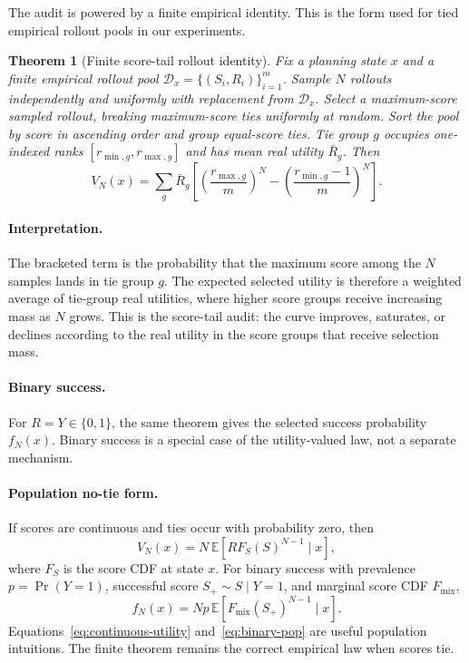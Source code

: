 \documentclass{article}
\newtheorem{theorem}{Theorem}
\begin{document}
The audit is powered by a finite empirical identity. This is the form used for tied empirical rollout pools in our experiments.

\begin{theorem}[Finite score-tail rollout identity]
\label{thm:finite}
Fix a planning state $x$ and a finite empirical rollout pool $\mathcal{D}_x=\{(S_i,R_i)\}_{i=1}^m$. Sample $N$ rollouts independently and uniformly with replacement from $\mathcal{D}_x$. Select a maximum-score sampled rollout, breaking maximum-score ties uniformly at random. Sort the pool by score in ascending order and group equal-score ties. Tie group $g$ occupies one-indexed ranks $[r_{\min,g},r_{\max,g}]$ and has mean real utility $\bar R_g$. Then
\[
V_N(x)=
\sum_g \bar R_g
\left[
\left(\frac{r_{\max,g}}{m}\right)^N
-
\left(\frac{r_{\min,g}-1}{m}\right)^N
\right].
\]
\end{theorem}

\paragraph{Interpretation.}
The bracketed term is the probability that the maximum score among the $N$ samples lands in tie group $g$. The expected selected utility is therefore a weighted average of tie-group real utilities, where higher score groups receive increasing mass as $N$ grows. This is the score-tail audit: the curve improves, saturates, or declines according to the real utility in the score groups that receive selection mass.

\paragraph{Binary success.}
For $R=Y\in\{0,1\}$, the same theorem gives the selected success probability $f_N(x)$. Binary success is a special case of the utility-valued law, not a separate mechanism.

\paragraph{Population no-tie form.}
If scores are continuous and ties occur with probability zero, then
\begin{equation}
\label{eq:continuous-utility}
V_N(x)=N\,\mathbb{E}\!\left[R F_S(S)^{N-1}\mid x\right],
\end{equation}
where $F_S$ is the score CDF at state $x$. For binary success with prevalence $p=\Pr(Y=1)$, successful score $S_+\sim S\mid Y=1$, and marginal score CDF $F_{\mathrm{mix}}$,
\begin{equation}
\label{eq:binary-pop}
f_N(x)=Np\,\mathbb{E}\!\left[F_{\mathrm{mix}}(S_+)^{N-1}\mid x\right].
\end{equation}
Equations~\ref{eq:continuous-utility} and~\ref{eq:binary-pop} are useful population intuitions. The finite theorem remains the correct empirical law when scores tie.
\end{document}
